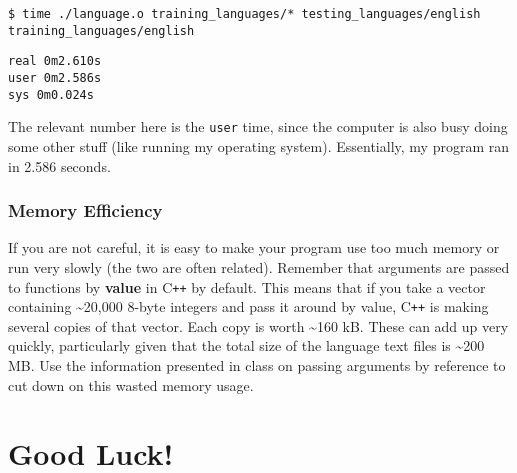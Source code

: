 \documentclass[]{article}
\begin{document}
\texttt{\$ time ./language.o training_languages/* testing_languages/english}
\texttt{training_languages/english}


\texttt{real     0m2.610s}\\
\texttt{user     0m2.586s}\\
\texttt{sys      0m0.024s}

The relevant number here is the \texttt{user} time, since the computer
is also busy doing some other stuff (like running my operating system).
Essentially, my program ran in 2.586 seconds.

\subsubsection{Memory Efficiency}\label{memory-efficiency}

If you are not careful, it is easy to make your program use too much
memory or run very slowly (the two are often related). Remember that
arguments are passed to functions by \textbf{value} in C\texttt{++} by default.
This means that if you take a vector containing \textasciitilde{}20,000
8-byte integers and pass it around by value, C\texttt{++} is making several
copies of that vector. Each copy is worth \textasciitilde{}160 kB. These
can add up very quickly, particularly given that the total size of the
language text files is \textasciitilde{}200 MB. Use the information
presented in class on passing arguments by reference to cut down on this
wasted memory usage.

\section{Good Luck!}\label{good-luck}
\end{document}
